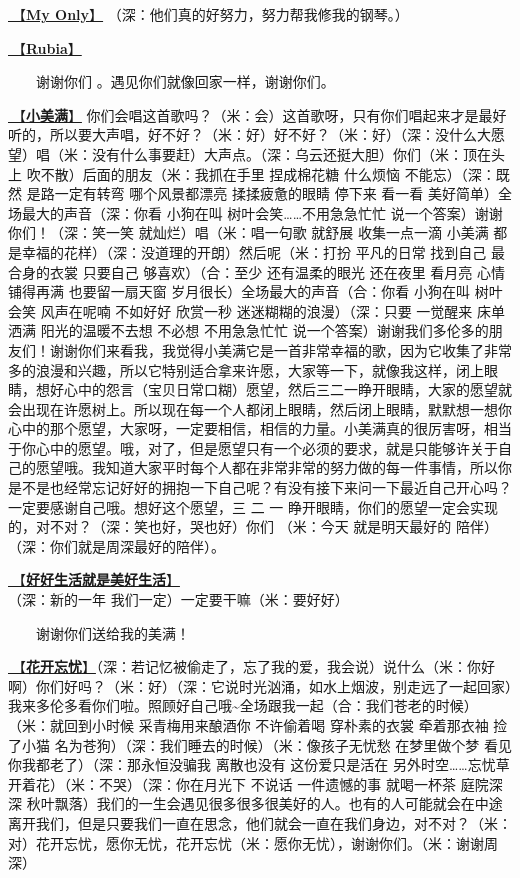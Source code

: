 \documentclass[]{ctexbook}
\begin{document}
\hyperref[my-only]{🎵【\textbf{My Only}】} （深：他们真的好努力，努力帮我修我的钢琴。）

\hyperref[rubia]{🎵【\textbf{Rubia}】}

  谢谢你们 。遇见你们就像回家一样，谢谢你们。

\hyperref[happy-ending]{🎵【\textbf{小美满}】} 你们会唱这首歌吗？（米：会）这首歌呀，只有你们唱起来才是最好听的，所以要大声唱，好不好？（米：好）好不好？（米：好）（深：没什么大愿望）唱（米：没有什么事要赶）大声点。（深：乌云还挺大胆）你们（米：顶在头上 吹不散）后面的朋友（米：我抓在手里 捏成棉花糖 什么烦恼 不能忘）（深：既然 是路一定有转弯 哪个风景都漂亮 揉揉疲惫的眼睛 停下来 看一看 美好简单）全场最大的声音（深：你看 小狗在叫 树叶会笑\ldots\ldots 不用急急忙忙 说一个答案）谢谢你们！（深：笑一笑 就灿烂）唱（米：唱一句歌 就舒展 收集一点一滴 小美满 都是幸福的花样）（深：没道理的开朗）然后呢（米：打扮 平凡的日常 找到自己 最合身的衣裳 只要自己 够喜欢）（合：至少 还有温柔的眼光 还在夜里 看月亮 心情铺得再满 也要留一扇天窗 岁月很长）全场最大的声音（合：你看 小狗在叫 树叶会笑 风声在呢喃 不如好好 欣赏一秒 迷迷糊糊的浪漫）（深：只要 一觉醒来 床单洒满 阳光的温暖不去想 不必想 不用急急忙忙 说一个答案）谢谢我们多伦多的朋友们！谢谢你们来看我，我觉得小美满它是一首非常幸福的歌，因为它收集了非常多的浪漫和兴趣，所以它特别适合拿来许愿，大家等一下，就像我这样，闭上眼睛，想好心中的怨言（宝贝日常口糊）愿望，然后三二一睁开眼睛，大家的愿望就会出现在许愿树上。所以现在每一个人都闭上眼睛，然后闭上眼睛，默默想一想你心中的那个愿望，大家呀，一定要相信，相信的力量。小美满真的很厉害呀，相当于你心中的愿望。哦，对了，但是愿望只有一个必须的要求，就是只能够许关于自己的愿望哦。我知道大家平时每个人都在非常非常的努力做的每一件事情，所以你是不是也经常忘记好好的拥抱一下自己呢？有没有接下来问一下最近自己开心吗？一定要感谢自己哦。想好这个愿望，三 二 一 睁开眼睛，你们的愿望一定会实现的，对不对？（深：笑也好，哭也好）你们 （米：今天 就是明天最好的 陪伴）（深：你们就是周深最好的陪伴）。

\hyperref[live-happy-life-happy]{🎵【\textbf{好好生活就是美好生活}】}（深：新的一年 我们一定）一定要干嘛（米：要好好）

  谢谢你们送给我的美满！

\hyperref[no-worries]{🎵【\textbf{花开忘忧}】}（深：若记忆被偷走了，忘了我的爱，我会说）说什么（米：你好啊）你们好吗？（米：好）（深：它说时光汹涌，如水上烟波，别走远了一起回家）我来多伦多看你们啦。照顾好自己哦\textasciitilde 全场跟我一起（合：我们苍老的时候）（米：就回到小时候 采青梅用来酿酒你 不许偷着喝 穿朴素的衣裳 牵着那衣袖 捡了小猫 名为苍狗）（深：我们睡去的时候）（米：像孩子无忧愁 在梦里做个梦 看见你我都老了）（深：那永恒没骗我 离散也没有 这份爱只是活在 另外时空\ldots\ldots 忘忧草 开着花）（米：不哭）（深：你在月光下 不说话 一件遗憾的事 就喝一杯茶 庭院深深 秋叶飘落）我们的一生会遇见很多很多很美好的人。也有的人可能就会在中途离开我们，但是只要我们一直在思念，他们就会一直在我们身边，对不对？（米：对）花开忘忧，愿你无忧，花开忘忧（米：愿你无忧），谢谢你们。（米：谢谢周深）
\end{document}
